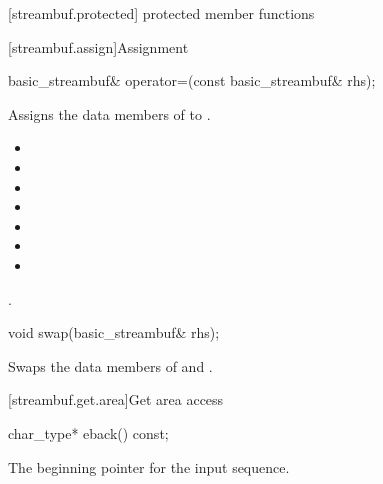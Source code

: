 [streambuf.protected]{ protected member functions}

[streambuf.assign]{Assignment}

%
%
\begin{itemdecl}
basic_streambuf& operator=(const basic_streambuf& rhs);
\end{itemdecl}

\begin{itemdescr}
\pnum
\effects Assigns the data members of 
to .

\pnum
\postconditions

\begin{itemize}
\item {}
\item {}
\item {}
\item {}
\item {}
\item {}
\item {}
\end{itemize}

\pnum
\returns {}.
\end{itemdescr}

%
%
\begin{itemdecl}
void swap(basic_streambuf& rhs);
\end{itemdecl}

\begin{itemdescr}
\pnum
\effects Swaps the data members of 
and .
\end{itemdescr}

[streambuf.get.area]{Get area access}

%
\begin{itemdecl}
char_type* eback() const;
\end{itemdecl}

\begin{itemdescr}
\pnum
\returns
The beginning pointer for the input sequence.
\end{itemdescr}

